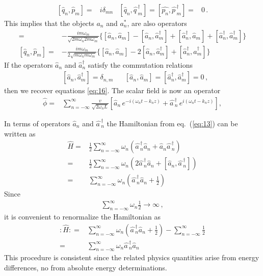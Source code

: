 \begin{align}
\label{eq:16}
  [\widehat{q}_n,\widehat{p}_m]=&i\delta_{m n} &
  [\widehat{q}_n,\widehat{q\,}_m^\dagger]= [\widehat{p_n},\widehat{p\,}_m^\dagger]=&0\,. 
\end{align}
This implies that the objects $a_n$ and $a_n^*$, are also operators
\begin{align}
  [\widehat{q}_n,\widehat{p}_m]=&-\frac{i m\omega_m}{\sqrt{2m\omega_n 2m\omega_m}}\{ 
[\widehat{a}_{n},\widehat{a}_{m}]-[\widehat{a}_{n},\widehat{a}_{m}^\dagger]
+[\widehat{a}_{n}^\dagger,\widehat{a}_{m}]+[\widehat{a}_{n}^\dagger,\widehat{a}_{m}^\dagger]
\} \nonumber\\
  [\widehat{q}_n,\widehat{p}_m]=&-\frac{i m\omega_m}{2\sqrt{m\omega_n m\omega_m}}\{ 
[\widehat{a}_{n},\widehat{a}_{m}]-2[\widehat{a}_{n},\widehat{a}_{m}^\dagger]
+[\widehat{a}_{n}^\dagger,\widehat{a}_{m}^\dagger]
\} 
\end{align}
If the operators $\widehat{a}_{n}$ and $\widehat{a}_{n}^\dagger$ satisfy the commutation relations
\begin{align}
\label{eq:17}
  &\left[\widehat{a}_{n},\widehat{a}_{m}^\dagger\right]=
\delta_{{n},{m}}&
&\left[\widehat{a}_{n},\widehat{a}_{m}\right]=
\left[\widehat{a}_{n}^\dagger,\widehat{a}_{m}^\dagger\right]=0\,,
\end{align}
then we recover equations \eqref{eq:16}. The scalar field is now an operator
\begin{align}
\label{eq:18}
  \widehat{\phi}=&\sum_{n=-\infty}^\infty\frac{v}{\sqrt{2\omega_nL}}
  \left[\widehat{a}_n\,e^{-i(\omega_n t-k_n z)}+\widehat{a\,}_n^\dagger\,e^{i(\omega_n t-k_n z)}\right],
\end{align}


In terms of operators $\widehat{a}_{n}$ and $\widehat{a\,}_{n}^\dagger$ the Hamiltonian from eq.~(\ref{eq:13}) can be written as
\begin{align}
\label{eq:129}
\widehat{H}=&\frac{1}{2}\sum_{n=-\infty}^{\infty} \omega_n (\widehat{a\,}_{n}^\dagger\widehat{a}_{n} +\widehat{a}_{n} \widehat{a\,}_{n}^\dagger)
\nonumber\\
=&\frac{1}{2}\sum_{n=-\infty}^{\infty} \omega_n \left(2\widehat{a\,}_{n}^\dagger\widehat{a}_{n} 
+\left[\widehat{a}_{n}, \widehat{a\,}_{n}^\dagger\right]\right)
\nonumber\\
=&\sum_{n=-\infty}^{\infty} \omega_n \left(\widehat{a\,}_{n}^\dagger\widehat{a}_{n} +\frac{1}{2}\right)
\end{align}
Since
\begin{align}
  \sum_{n=-\infty}^{\infty}\omega_n \frac{1}{2}\to\infty\,,
\end{align}
it is convenient to renormalize the Hamiltonian as
\begin{align}
\label{eq:130}
  \colon\!\widehat{H}\colon=&\sum_{n=-\infty}^{\infty} \omega_n \left(\widehat{a\,}_{n}^\dagger\widehat{a}_{n} +\frac{1}{2}\right)-
  \sum_{n=-\infty}^{\infty} \frac{1}{2}\nonumber\\
=&\sum_{n=-\infty}^{\infty} \omega_n \widehat{a\,}_{n}^\dagger\widehat{a}_{n}
\end{align}
This procedure is consistent since the related physics quantities arise from energy differences, no from absolute energy determinations.

